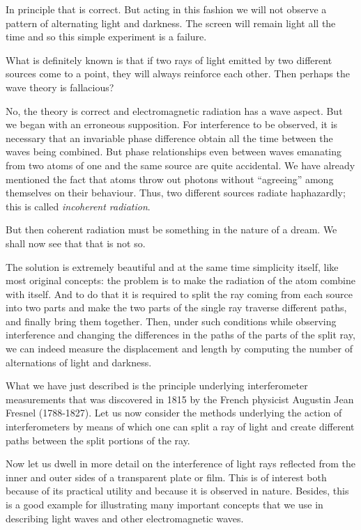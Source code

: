 In principle that is correct. But acting in this fashion we will not observe a pattern of alternating light and darkness. The screen will remain light all the time and so this simple experiment is a failure.

What is definitely known is that if two rays of light emitted by two different sources come to a point, they will always reinforce each other. Then perhaps the wave theory is fallacious?

No, the theory is correct and electromagnetic radiation has a wave aspect. But we began with an erroneous supposition. For interference to be observed, it is neces­sary that an invariable phase difference obtain all the time between the waves being combined. But phase re­lationships even between waves emanating from two atoms of one and the same source are quite accidental. We have already mentioned the fact that atoms throw out photons without ``agreeing'' among themselves on their behaviour. Thus, two different sources radiate haphazardly; this is called \emph{incoherent radiation}.

But then coherent radiation must be something in the nature of a dream. We shall now see that that is not so. 

The solution is extremely beautiful and at the same time simplicity itself, like most original concepts: the problem is to make the radiation of the atom combine with itself. And to do that it is required to split the ray coming from each source into two parts and make the two parts of the single ray traverse different paths, and finally bring them together. Then, under such conditions while observing interference and changing the differences in the paths of the parts of the split ray, we can indeed measure the displacement and length by computing the number of alternations of light and darkness.

What we have just described is the principle underlying interferometer measurements that was discovered in 1815 by the French physicist Augustin Jean Fresnel (1788-1827). Let us now consider the methods underlying the action of interferometers by means of which one can split a ray of light and create different paths between the split
portions of the ray.

Now let us dwell in more detail on the interference of
light rays reflected from the inner and outer sides of a transparent plate or film. This is of interest both because of its practical utility and because it is observed in nature. Besides, this is a good example for illustrating many
important concepts that we use in describing light waves and other electromagnetic waves.

